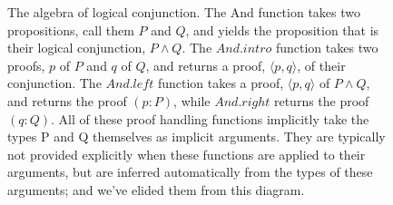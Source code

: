 \documentclass[letterpaper]{article}
\begin{document}
\begin{figure}[h!]
\caption{The algebra of logical conjunction. The And function takes two propositions, call them $P$ and $Q$, 
and yields the proposition that is their logical conjunction, $P \land Q$. The $And.intro$ function takes
two proofs, $p$ of $P$ and $q$ of $Q$, and returns a proof, $\langle p, q \rangle$, of their conjunction. The $And.left$
function takes a proof, $\langle p, q \rangle$ of $P \land Q$, and returns the proof $(p : P)$, while $And.right$ returns 
the proof $(q : Q)$. All of these proof handling functions implicitly take the types P and Q themselves as 
implicit arguments. They are typically not provided explicitly when these functions are applied to their 
arguments, but are inferred automatically from the types of these arguments; and we've elided them from
this diagram.}
\label{fig:tikz_diagram_definitive}
\end{figure}
\end{document}
